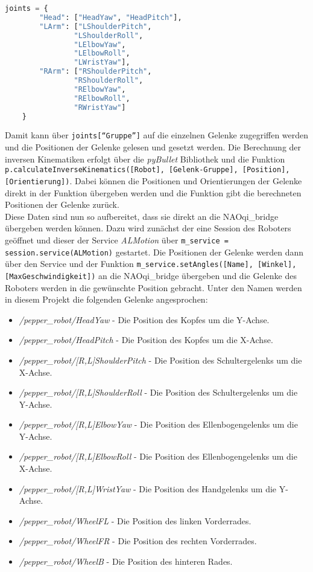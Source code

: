 \begin{lstlisting}[language=Python, caption=Gelenk-Grupperierung, label=lst:gelenk-grupperierung]
    joints = {
        "Head": ["HeadYaw", "HeadPitch"],
        "LArm": ["LShoulderPitch",
                "LShoulderRoll",
                "LElbowYaw",
                "LElbowRoll",
                "LWristYaw"],
        "RArm": ["RShoulderPitch",
                "RShoulderRoll",
                "RElbowYaw",
                "RElbowRoll",
                "RWristYaw"]
    }
\end{lstlisting}
Damit kann über \texttt{joints[``Gruppe'']} auf die einzelnen Gelenke zugegriffen werden und die Positionen der Gelenke gelesen und gesetzt werden. Die Berechnung der inversen Kinematiken erfolgt über die \textit{pyBullet} Bibliothek und die Funktion \texttt{p.calculateInverseKinematics([Robot], [Gelenk-Gruppe], [Position], [Orientierung])}. Dabei können die Positionen und Orientierungen der Gelenke direkt in der Funktion übergeben werden und die Funktion gibt die berechneten Positionen der Gelenke zurück.\\
Diese Daten sind nun so aufbereitet, dass sie direkt an die NAOqi\_bridge übergeben werden können. Dazu wird zunächst der eine Session des Roboters geöffnet und dieser der Service \textit{ALMotion} über \texttt{m\_service = session.service(ALMotion)} gestartet. Die Positionen der Gelenke werden dann über den Service und der Funktion \texttt{m\_service.setAngles([Name], [Winkel], [MaxGeschwindigkeit])} an die NAOqi\_bridge übergeben und die Gelenke des Roboters werden in die gewünschte Position gebracht. Unter den Namen werden in diesem Projekt die folgenden Gelenke angesprochen:
\begin{itemize}
    \item \textit{/pepper\_robot/HeadYaw} - Die Position des Kopfes um die Y-Achse.
    \item \textit{/pepper\_robot/HeadPitch} - Die Position des Kopfes um die X-Achse.
    \item \textit{/pepper\_robot/[R,L]ShoulderPitch} - Die Position des Schultergelenks um die X-Achse.
    \item \textit{/pepper\_robot/[R,L]ShoulderRoll} - Die Position des Schultergelenks um die Y-Achse.
    \item \textit{/pepper\_robot/[R,L]ElbowYaw} - Die Position des Ellenbogengelenks um die Y-Achse.
    \item \textit{/pepper\_robot/[R,L]ElbowRoll} - Die Position des Ellenbogengelenks um die X-Achse.
    \item \textit{/pepper\_robot/[R,L]WristYaw} - Die Position des Handgelenks um die Y-Achse.
    \item \textit{/pepper\_robot/WheelFL} - Die Position des linken Vorderrades.
    \item \textit{/pepper\_robot/WheelFR} - Die Position des rechten Vorderrades.
    \item \textit{/pepper\_robot/WheelB} - Die Position des hinteren Rades.
\end{itemize}


